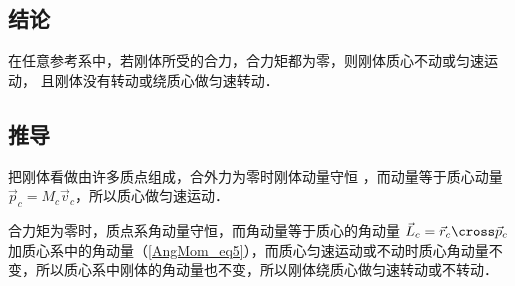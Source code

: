 \subsection{结论}
在任意参考系中，若刚体所受的合力，合力矩都为零，则刚体质心不动或匀速运动， 且刚体没有转动或绕质心做匀速转动．

\subsection{推导}
把刚体看做由许多质点组成，合外力为零时刚体动量守恒%
，而动量等于质心动量
$\vec p_c = M_c \vec v_c$，所以质心做匀速运动．

合力矩为零时，质点系角动量守恒，而角动量等于质心的角动量 $\vec L_c =\vec r_c\cross\vec p_c$ 加质心系中的角动量（\autoref{AngMom_eq5}），而质心匀速运动或不动时质心角动量不变，所以质心系中刚体的角动量也不变，所以刚体绕质心做匀速转动或不转动．
